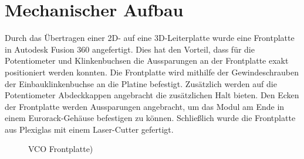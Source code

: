 \newpage

\section{Mechanischer Aufbau}
Durch das Übertragen einer 2D- auf eine 3D-Leiterplatte wurde eine Frontplatte in Autodesk Fusion 360 angefertigt.
Dies hat den Vorteil, dass für die Potentiometer und Klinkenbuchsen die Aussparungen an der Frontplatte exakt positioniert werden konnten.
Die Frontplatte wird mithilfe der Gewindeschrauben der Einbauklinkenbuchse an die Platine befestigt.
Zusätzlich werden auf die Potentiometer Abdeckkappen angebracht die zusätzlichen Halt bieten.
Den Ecken der Frontplatte werden Aussparungen angebracht, um das Modul am Ende in einem Eurorack-Gehäuse befestigen zu können.
Schließlich wurde die Frontplatte aus Plexiglas mit einem Laser-Cutter gefertigt.

\begin{figure}[h]
	\centering
	\setlength{\fboxsep}{1pt} %
	\setlength{\fboxrule}{1pt} %
	\caption{VCO Frontplatte)}
	\label{fig:VCO Frontplattemit 3D-Leiterplatte}
\end{figure}